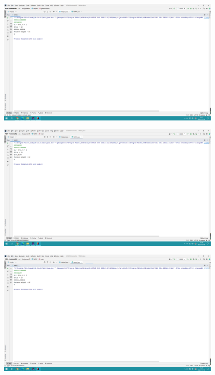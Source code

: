 \documentclass[]{article}
\begin{document}
	\begin{figure}[H]
		\centering
		\includegraphics[width=1\linewidth]{screen/A1-6}
		\caption{}
		\label{fig:a1-1}
	\end{figure}
	
	\begin{figure}[H]
		\centering
		\includegraphics[width=1\linewidth]{screen/A1-7}
		\caption{}
		\label{fig:a1-1}
	\end{figure}
	
	\begin{figure}[H]
		\centering
		\includegraphics[width=1\linewidth]{screen/A1-8}
		\caption{}
		\label{fig:a1-1}
	\end{figure}
	
\end{document}
